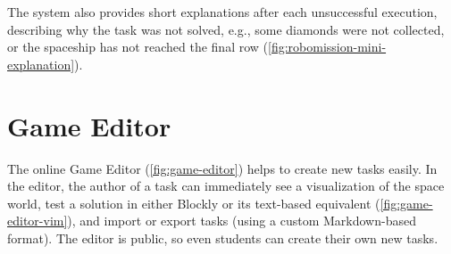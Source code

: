 The system also provides short explanations after each unsuccessful execution,
describing why the task was not solved,
e.g., some diamonds were not collected,
or the spaceship has not reached the final row
(\cref{fig:robomission-mini-explanation}).


\section{Game Editor}  %
\label{sec:robomission.task-editor}

The online Game Editor (\cref{fig:game-editor})
helps to create new tasks easily.
In the editor, the author of a task can immediately see a visualization of the
space world,
test a solution in either Blockly or its text-based equivalent %
(\cref{fig:game-editor-vim}),
and import or export tasks (using a custom Markdown-based format).
The editor is public, so even students can create their own new tasks.


